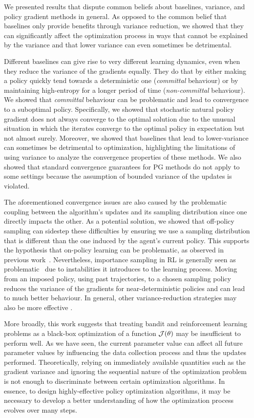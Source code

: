 We presented results that dispute common beliefs about baselines, variance, and policy gradient methods in general. 
As opposed to the common belief that baselines only provide benefits through variance reduction, we showed that they can significantly affect the optimization process in ways that cannot be explained by the variance and that lower variance can even sometimes be detrimental.

Different baselines can give rise to very different learning dynamics, even when they reduce the variance of the gradients equally. They do that by either making a policy quickly tend towards a deterministic one (\emph{committal} behaviour) or by maintaining high-entropy for a longer period of time (\emph{non-committal} behaviour). We showed that \textit{committal} behaviour can be problematic and lead to convergence to a suboptimal policy. Specifically, we showed that stochastic natural policy gradient does not always converge to the optimal solution due to the unusual situation in which the iterates converge to the optimal policy in expectation but not almost surely. 
Moreover, we showed that baselines that lead to lower-variance can sometimes be detrimental to optimization, highlighting the limitations of using variance to analyze the convergence properties of these methods. 
We also showed that standard convergence guarantees for PG methods do not apply to some settings because the assumption of bounded variance of the updates is violated.

The aforementioned convergence issues are also caused by the problematic coupling between the algorithm's updates and its sampling distribution since one directly impacts the other. As a potential solution, we showed that off-policy sampling can sidestep these difficulties by ensuring we use a sampling distribution that is different than the one induced by the agent's current policy. This supports the hypothesis that on-policy learning can be problematic, as observed in previous work~\citep{schaul2019ray, hennes2020neural}. Nevertheless, importance sampling in RL is generally seen as problematic~\citep{vanHasselt2018deadly_triad} due to instabilities it introduces to the learning process. Moving from an imposed policy, using past trajectories, to a chosen sampling policy reduces the variance of the gradients for near-deterministic policies and can lead to much better behaviour. In general, other variance-reduction strategies may also be more effective \cite{xu2019sample}.

More broadly, this work suggests that treating bandit and reinforcement learning problems as a black-box optimization of a function ${\mathcal{J}}(\theta)$ may be insufficient to perform well. As we have seen, the current parameter value can affect all future parameter values by influencing the data collection process and thus the updates performed. Theoretically, relying on immediately available quantities such as the gradient variance and ignoring the sequential nature of the optimization problem is not enough to discriminate between certain optimization algorithms. In essence, to design highly-effective policy optimization algorithms, it may be necessary to develop a better understanding of how the optimization process evolves over many steps. 


